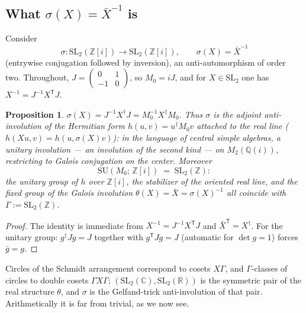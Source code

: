 \documentclass[11pt]{amsart}
\numberwithin{equation}{section}
\theoremstyle{plain}
\newtheorem{proposition}[theorem]{Proposition}
\theoremstyle{definition}
\theoremstyle{remark}
\newcommand{\C}{\mathbb{C}}
\newcommand{\R}{\mathbb{R}}
\newcommand{\Q}{\mathbb{Q}}
\newcommand{\Z}{\mathbb{Z}}
\newcommand{\Zi}{\Z[i]}
\newcommand{\SL}{\mathrm{SL}}
\newcommand{\SU}{\mathrm{SU}}
\begin{document}
\subsection{What $\sigma(X) = \bar X^{-1}$ is}\label{subsec:sigma}

Consider
\[
  \sigma: \SL_2(\Zi) \to \SL_2(\Zi), \qquad \sigma(X) = \bar X^{-1}
\]
(entrywise conjugation followed by inversion), an anti-automorphism of
order two.  Throughout, $J = \begin{pmatrix} 0 & 1 \\ -1 &
0\end{pmatrix}$, so $M_0 = iJ$, and for $X \in \SL_2$ one has
$X^{-1} = J^{-1}X^{\mathsf T}J$.

\begin{proposition}\label{prop:unitaryinv}
$\sigma(X) = J^{-1}X^{\dagger}J = M_0^{-1}X^{\dagger}M_0$.  Thus
$\sigma$ is the adjoint anti-involution of the Hermitian form
$h(u, v) = u^{\dagger}M_0 v$ attached to the real line
($h(Xu, v) = h(u, \sigma(X)v)$): in the language of central simple
algebras, a \emph{unitary involution} --- an involution of the second
kind --- on $M_2(\Q(i))$, restricting to Galois conjugation on the
center.  Moreover
\[
  \SU(M_0;\, \Zi) \;=\; \SL_2(\Z):
\]
the unitary group of $h$ over $\Zi$, the stabilizer of the oriented real
line, and the fixed group of the Galois involution
$\theta(X) = \bar X = \sigma(X)^{-1}$ all coincide with
$\Gamma := \SL_2(\Z)$.
\end{proposition}

\begin{proof}
The identity is immediate from $X^{-1} = J^{-1}X^{\mathsf T}J$ and
$\bar X^{\mathsf T} = X^\dagger$.  For the unitary group:
$g^{\dagger}Jg = J$ together with $g^{\mathsf T}Jg = J$ (automatic for
$\det g = 1$) forces $\bar g = g$.
\end{proof}

Circles of the Schmidt arrangement correspond to cosets $X\Gamma$, and
$\Gamma$-classes of circles to double cosets $\Gamma X\Gamma$;
$(\SL_2(\C), \SL_2(\R))$ is the symmetric pair of the real structure
$\theta$, and $\sigma$ is the Gelfand-trick anti-involution of that
pair.  Arithmetically it is far from trivial, as we now see.
\end{document}
